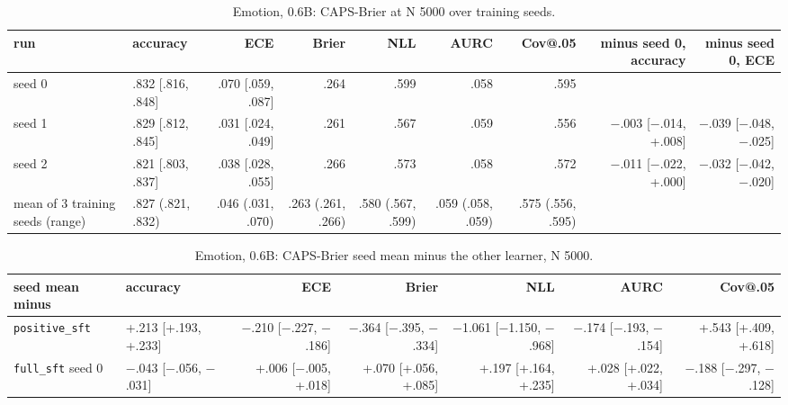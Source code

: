 \documentclass[10pt,letterpaper]{article}
\theoremstyle{plain}
\begin{document}
\begin{table}[H]
\centering
\footnotesize
\setlength{\tabcolsep}{3pt}
\caption{Emotion, 0.6B: CAPS-Brier at N 5000 over training seeds.}
\label{tab:A7c}
\begin{adjustbox}{max width=\textwidth}
\begin{tabular}{llrrrrrrr}
\toprule
run & accuracy & ECE & Brier & NLL & AURC & Cov@.05 & minus seed 0, accuracy & minus seed 0, ECE \\
\midrule
seed 0 & .832 [.816, .848] & .070 [.059, .087] & .264 & .599 & .058 & .595 &  &  \\
seed 1 & .829 [.812, .845] & .031 [.024, .049] & .261 & .567 & .059 & .556 & $-$.003 [$-$.014, +.008] & $-$.039 [$-$.048, $-$.025] \\
seed 2 & .821 [.803, .837] & .038 [.028, .055] & .266 & .573 & .058 & .572 & $-$.011 [$-$.022, +.000] & $-$.032 [$-$.042, $-$.020] \\
mean of 3 training seeds (range) & .827 (.821, .832) & .046 (.031, .070) & .263 (.261, .266) & .580 (.567, .599) & .059 (.058, .059) & .575 (.556, .595) &  &  \\
\bottomrule
\end{tabular}
\end{adjustbox}
\end{table}

\begin{table}[H]
\centering
\footnotesize
\setlength{\tabcolsep}{3pt}
\caption{Emotion, 0.6B: CAPS-Brier seed mean minus the other learner, N 5000.}
\label{tab:A7d}
\begin{adjustbox}{max width=\textwidth}
\begin{tabular}{llrrrrr}
\toprule
seed mean minus & accuracy & ECE & Brier & NLL & AURC & Cov@.05 \\
\midrule
\texttt{positive\_sft} & +.213 [+.193, +.233] & $-$.210 [$-$.227, $-$.186] & $-$.364 [$-$.395, $-$.334] & $-$1.061 [$-$1.150, $-$.968] & $-$.174 [$-$.193, $-$.154] & +.543 [+.409, +.618] \\
\texttt{full\_sft} seed 0 & $-$.043 [$-$.056, $-$.031] & +.006 [$-$.005, +.018] & +.070 [+.056, +.085] & +.197 [+.164, +.235] & +.028 [+.022, +.034] & $-$.188 [$-$.297, $-$.128] \\
\bottomrule
\end{tabular}
\end{adjustbox}
\end{table}
\end{document}
